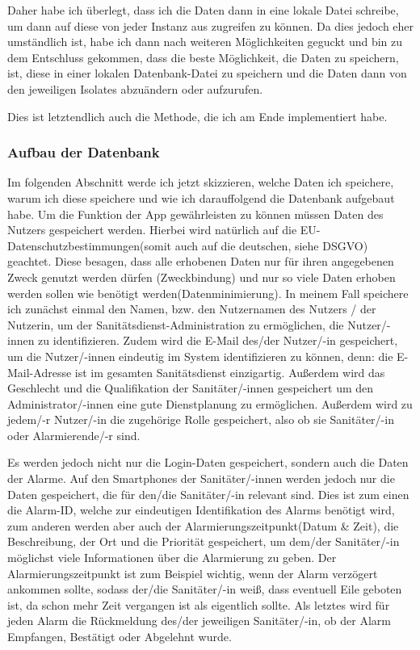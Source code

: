     Daher habe ich überlegt, dass ich die Daten dann in eine lokale Datei schreibe, um dann 
    auf diese von jeder Instanz aus zugreifen zu können. Da dies jedoch eher umständlich ist, habe 
    ich dann nach weiteren Möglichkeiten geguckt und bin zu dem Entschluss gekommen, dass die 
    beste Möglichkeit, die Daten zu speichern, ist, diese in einer lokalen Datenbank-Datei zu 
    speichern und die Daten dann von den jeweiligen Isolates abzuändern oder aufzurufen.

    Dies ist letztendlich auch die Methode, die ich am Ende implementiert habe.
\subsubsection{Aufbau der Datenbank}

    Im folgenden Abschnitt werde ich jetzt skizzieren, welche Daten ich speichere, warum ich 
    diese speichere und wie ich darauffolgend die Datenbank aufgebaut habe. Um die Funktion der 
    App gewährleisten zu können müssen Daten des Nutzers gespeichert werden. Hierbei wird 
    natürlich auf die EU-Datenschutzbestimmungen(somit auch auf die deutschen, siehe DSGVO) geachtet. Diese besagen, dass 
    alle erhobenen Daten nur für ihren angegebenen Zweck genutzt werden dürfen (Zweckbindung) und nur so viele Daten 
    erhoben werden sollen wie benötigt werden(Datenminimierung)\cite{DSGVO}. In meinem Fall 
    speichere ich zunächst einmal den Namen, bzw. den Nutzernamen des Nutzers / der Nutzerin, 
    um der Sanitätsdienst-Administration zu ermöglichen, die Nutzer/-innen zu identifizieren.
    Zudem wird die E-Mail des/der Nutzer/-in gespeichert, um die Nutzer/-innen eindeutig im 
    System identifizieren zu können, denn: die E-Mail-Adresse ist im gesamten Sanitätsdienst 
    einzigartig. Außerdem wird das Geschlecht und die Qualifikation der Sanitäter/-innen 
    gespeichert um den Administrator/-innen eine gute Dienstplanung zu ermöglichen.
    Außerdem wird zu jedem/-r Nutzer/-in die zugehörige Rolle gespeichert, also ob sie 
    Sanitäter/-in oder Alarmierende/-r sind.
    
    Es werden jedoch nicht nur die Login-Daten gespeichert, sondern auch die Daten der 
    Alarme. Auf den Smartphones der Sanitäter/-innen werden jedoch nur die Daten gespeichert, die 
    für den/die Sanitäter/-in relevant sind. Dies ist zum einen die Alarm-ID, welche zur 
    eindeutigen Identifikation des Alarms benötigt wird, zum anderen werden aber auch der 
    Alarmierungszeitpunkt(Datum \& Zeit), die Beschreibung, der Ort und die Priorität gespeichert,
    um dem/der Sanitäter/-in möglichst viele Informationen über die Alarmierung zu geben. Der 
    Alarmierungszeitpunkt ist zum Beispiel wichtig, wenn der Alarm verzögert ankommen sollte, 
    sodass der/die Sanitäter/-in weiß, dass eventuell Eile geboten ist, da schon mehr Zeit 
    vergangen ist als eigentlich sollte. Als letztes wird für jeden Alarm die Rückmeldung des/der 
    jeweiligen Sanitäter/-in, ob der Alarm \glqq Empfangen\grqq{}, \glqq Bestätigt\grqq{} oder 
    \glqq Abgelehnt\grqq{} wurde.

